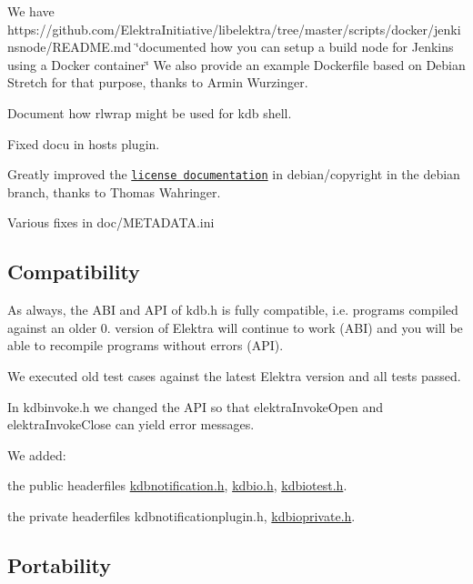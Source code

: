 \begin{DoxyItemize}
\item We have https\+://github.com/\+Elektra\+Initiative/libelektra/tree/master/scripts/docker/jenkinsnode/\+R\+E\+A\+D\+M\+E.\+md \char`\"{}documented how you can setup a build node for Jenkins using a Docker container\char`\"{} We also provide an example Dockerfile based on Debian Stretch for that purpose, thanks to Armin Wurzinger.
\item Document how {\ttfamily rlwrap} might be used for {\ttfamily kdb shell}.
\item Fixed docu in {\ttfamily hosts} plugin.
\item Greatly improved the \href{https://git.libelektra.org/blob/debian/debian/copyright}{\tt license documentation} in {\ttfamily debian/copyright} in the {\ttfamily debian} branch, thanks to Thomas Wahringer.
\item Various fixes in doc/\+M\+E\+T\+A\+D\+A\+T\+A.\+ini
\end{DoxyItemize}

\subsection*{Compatibility}

As always, the A\+BI and A\+PI of kdb.\+h is fully compatible, i.\+e. programs compiled against an older 0. version of Elektra will continue to work (A\+BI) and you will be able to recompile programs without errors (A\+PI).

We executed old test cases against the latest Elektra version and all tests passed.

In {\ttfamily kdbinvoke.\+h} we changed the A\+PI so that {\ttfamily elektra\+Invoke\+Open} and {\ttfamily elektra\+Invoke\+Close} can yield error messages.

We added\+:


\begin{DoxyItemize}
\item the public headerfiles {\ttfamily \hyperlink{kdbnotification_8h}{kdbnotification.\+h}}, {\ttfamily \hyperlink{kdbio_8h}{kdbio.\+h}}, {\ttfamily \hyperlink{kdbiotest_8h}{kdbiotest.\+h}}.
\item the private headerfiles {\ttfamily kdbnotificationplugin.\+h}, {\ttfamily \hyperlink{kdbioprivate_8h}{kdbioprivate.\+h}}.
\end{DoxyItemize}

\subsection*{Portability}


